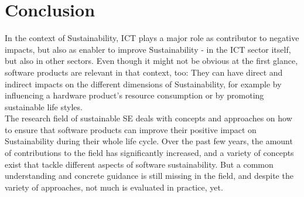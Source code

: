 \documentclass[oribibl]{llncs}
\begin{document}
\section{Conclusion}
In the context of Sustainability, ICT plays a major role as contributor to negative impacts, but also as enabler to improve Sustainability - in the ICT sector itself, but also in other sectors. Even though it might not be obvious at the first glance, software products are relevant in that context, too: They can have direct and indirect impacts on the different dimensions of Sustainability, for example by influencing a hardware product's resource consumption or by promoting sustainable life styles.\\
The research field of sustainable SE deals with concepts and approaches on how to ensure that software products can improve their positive impact on Sustainability during their whole life cycle. Over the past few years, the amount of contributions to the field has significantly increased, and a variety of concepts exist that tackle different aspects of software sustainability. But a common understanding and concrete guidance is still missing in the field, and despite the variety of approaches, not much is evaluated in practice, yet.
\end{document}
